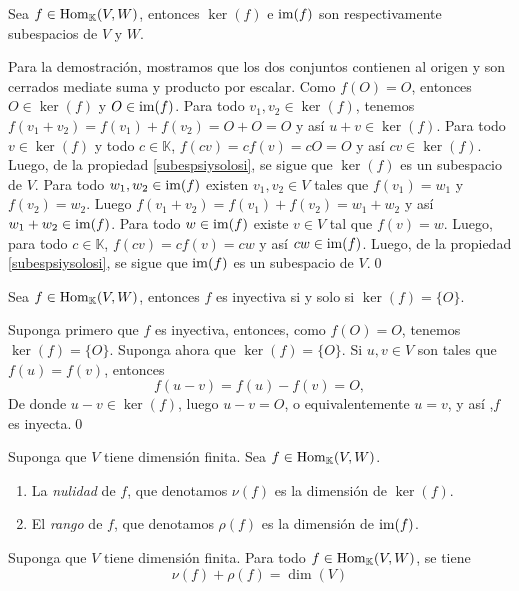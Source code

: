 \begin{pro}
Sea $f\in\operatorname{Hom}_{\mathbb{K}}(V,W)$, entonces $\ker(f)$ e $\operatorname{im}(f)$ son respectivamente subespacios de $V$ y $W$.
\end{pro}

\dem Para la demostración, mostramos que los dos conjuntos contienen al origen y son cerrados mediate suma y producto por escalar. Como $f(O)=O$, entonces $O\in\ker(f)$ y $O\in\operatorname{im}(f)$. Para todo $v_1,v_2\in \ker(f)$, tenemos $f(v_1+v_2)=f(v_1)+f(v_2)=O+O=O$ y  as\'i $u+v\in\ker(f)$. Para todo $v\in \ker(f)$ y todo $c\in \mathbb{K}$, $f(cv)=cf(v)=cO=O$ y as\'i $cv\in\ker(f)$. Luego, de la propiedad \ref{subespsiysolosi}, se sigue que $\ker(f)$ es un subespacio de $V$. Para todo $w_1,w_2\in \operatorname{im}(f)$ existen $v_1,v_2\in V$ tales que $f(v_1)=w_1$ y $f(v_2)=w_2$. Luego $f(v_1+v_2)=f(v_1)+f(v_2)=w_1+w_2$ y as\'i $w_1+w_2\in\operatorname{im}(f)$. Para todo $w\in\operatorname{im}(f)$ existe $v\in V$ tal que $f(v)=w$. Luego, para todo $c\in \mathbb{K}$, $f(cv)=cf(v)=cw$ y as\'i $cw\in\operatorname{im}(f)$. Luego, de la propiedad \ref{subespsiysolosi}, se sigue que $\operatorname{im}(f)$ es un subespacio de $V$.\qed

\begin{prop}\label{inyectiva}
Sea $f\in\operatorname{Hom}_{\mathbb{K}}(V,W)$, entonces $f$ es inyectiva si y solo si $\ker(f)=\{O\}$.
\end{prop}

\dem Suponga primero que $f$ es inyectiva, entonces, como $f(O)=O$, tenemos $\ker(f)=\{O\}$. Suponga ahora que $\ker(f)=\{O\}$. Si $u,v\in V$ son tales que $f(u)=f(v)$, entonces
\[
f(u-v)=f(u)-f(v)=O,
\]
De donde $u-v\in\ker(f)$, luego $u-v=O$, o equivalentemente $u=v$, y as\'i ,$f$ es inyecta.\qed

\begin{defn}
Suponga que $V$ tiene dimensi\'on finita. Sea $f\in\operatorname{Hom}_{\mathbb{K}}(V,W)$.
\begin{enumerate}
\item La \emph{nulidad} de $f$, que denotamos $\nu(f)$ es la dimensi\'on de $\ker(f)$.
\item El \emph{rango} de $f$, que denotamos $\rho(f)$ es la dimensi\'on de $\operatorname{im}(f)$.
\end{enumerate}
\end{defn}

\begin{teo}\label{teorango}
Suponga que $V$ tiene dimensi\'on finita. Para todo $f\in\operatorname{Hom}_{\mathbb{K}}(V,W)$, se tiene
\[
\nu(f)+\rho(f)=\dim (V)
\]
\end{teo}

